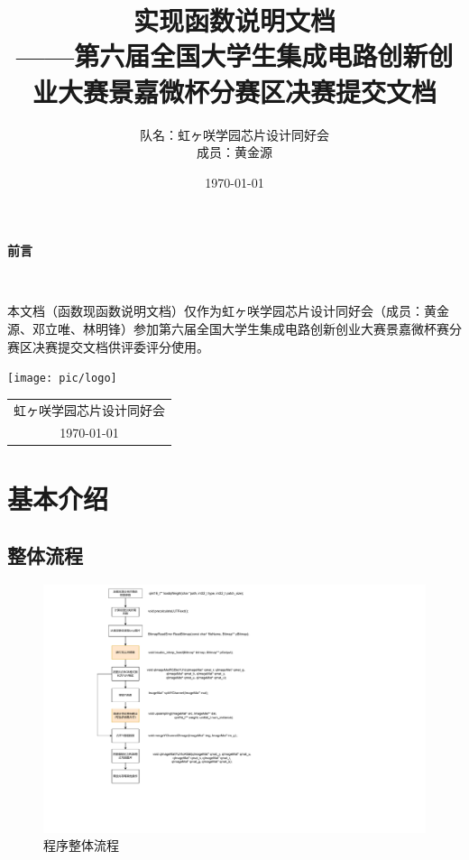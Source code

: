 \documentclass[12pt, a4paper, oneside]{ctexbook}
\title{{\Huge{\textbf{实现函数说明文档}}}\normalsize{\\——第六届全国大学生集成电路创新创业大赛景嘉微杯分赛区决赛提交文档}}
\author{队名：虹ヶ咲学园芯片设计同好会\\ 成员：黄金源\space邓立唯\space林明锋}
\date{\today}
\begin{document}
	
	\maketitle	
	\setcounter{page}{1}
	\begin{center}
		\Huge\textbf{前言}
	\end{center}~\

本文档（函数现函数说明文档）仅作为虹ヶ咲学园芯片设计同好会（成员：黄金源、邓立唯、林明锋）参加第六届全国大学生集成电路创新创业大赛景嘉微杯赛分赛区决赛提交文档供评委评分使用。
	~\\
	\begin{flushright}
		\texttt{[image: pic/logo]}\\
		\begin{tabular}{c}
			虹ヶ咲学园芯片设计同好会\\
			\today
		\end{tabular}
	\end{flushright}
	\newpage
	\setcounter{page}{1}
	\tableofcontents
	\newpage
	\setcounter{page}{1}
	
	\chapter{基本介绍}
	\section{整体流程}
		\begin{figure}[h]
			\centering
			\includegraphics[scale=0.5]{pic/overview}
			\caption{程序整体流程}
			\label{fig:overview}
		\end{figure}
\end{document}
